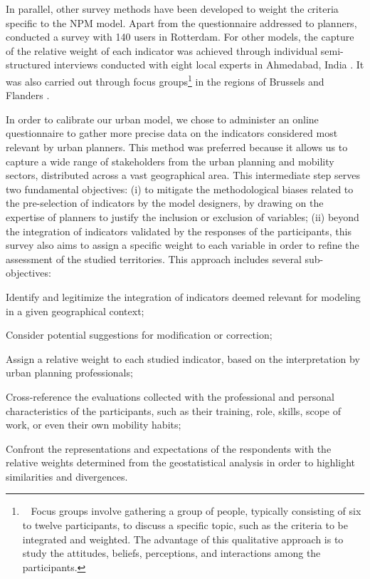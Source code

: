 \begin{refsegment}
In parallel, other survey methods have been developed to weight the criteria specific to the \acrshort{NPM} model. Apart from the questionnaire addressed to planners, \textcolor{blue}{\textcite[8]{groenendijk_incorporating_2018}} conducted a survey with 140 users in Rotterdam. For other models, the capture of the relative weight of each indicator was achieved through individual semi-structured interviews conducted with eight local experts in Ahmedabad, India \textcolor{blue}{\autocite[1018]{maheshwari_evaluating_2022}}. It was also carried out through focus groups\footnote{~
    Focus groups involve gathering a group of people, typically consisting of six to twelve participants, to discuss a specific topic, such as the criteria to be integrated and weighted. The advantage of this qualitative approach is to study the attitudes, beliefs, perceptions, and interactions among the participants.
} in the regions of Brussels and Flanders \textcolor{blue}{\autocite[95]{caset_planning_2019}}.%

In order to calibrate our urban model, we chose to administer an online questionnaire to gather more precise data on the indicators considered most relevant by urban planners. This method was preferred because it allows us to capture a wide range of stakeholders from the urban planning and mobility sectors, distributed across a vast geographical area. This intermediate step serves two fundamental objectives: (i) to mitigate the methodological biases related to the pre-selection of indicators by the model designers, by drawing on the expertise of planners to justify the inclusion or exclusion of variables; (ii) beyond the integration of indicators validated by the responses of the participants, this survey also aims to assign a specific weight to each variable in order to refine the assessment of the studied territories. This approach includes several sub-objectives:
\begin{customitemize}
    \item Identify and legitimize the integration of indicators deemed relevant for modeling in a given geographical context;
    \item Consider potential suggestions for modification or correction;
    \item Assign a relative weight to each studied indicator, based on the interpretation by urban planning professionals;
    \item Cross-reference the evaluations collected with the professional and personal characteristics of the participants, such as their training, role, skills, scope of work, or even their own mobility habits;
    \item Confront the representations and expectations of the respondents with the relative weights determined from the geostatistical analysis in order to highlight similarities and divergences.
\end{customitemize}%


\end{refsegment}

